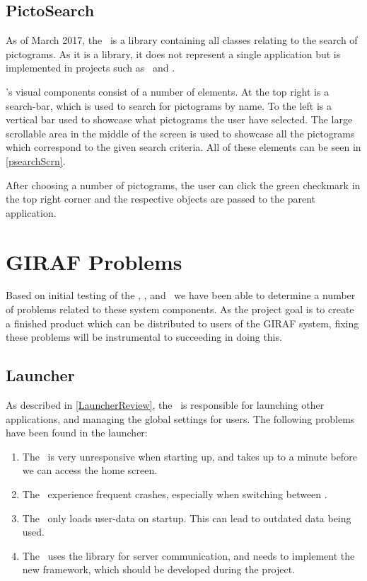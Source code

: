 \subsection{PictoSearch}\label{PictoSearchReview}
As of March 2017, the \plib\ is a library containing all
classes relating to the search of pictograms. As it is a library, it does not
represent a single application but is implemented in projects such as
\wapp\ and .\nl

\plib's visual components consist of a number of elements. At the top right is
a search-bar, which is used to search for pictograms by name. To the left is a
vertical bar used to showcase what pictograms the user have selected. The large
scrollable area in the middle of the screen is used to showcase all the
pictograms which correspond to the given search criteria. All of these elements
can be seen in \autoref{psearchScrn}.
 

After choosing a number of pictograms, the user can click the green checkmark in
the top right corner and the respective  objects are passed to
the parent application.

\section{GIRAF Problems}\label{GirafProblems}
Based on initial testing of the \lapp, \clib, and
\plib\ we have been able to determine a number of problems
related to these system components. As the project goal is to create a finished
product which can be distributed to users of the GIRAF system, fixing these problems
will be instrumental to succeeding in doing this.

\subsection{Launcher}
As described in \autoref{LauncherReview}, the \lapp\ is responsible for
launching other applications, and managing the global settings for users. The
following problems have been found in the launcher:
\begin{enumerate}
  \item The \lapp\ is very unresponsive when starting up, and takes up to a
  minute before we can access the home screen.
  \item The \lapp\ experience frequent crashes, especially when switching
  between .
  \item The \lapp\ only loads user-data on startup. This can lead to outdated
  data being used.
  \item The \lapp\ uses the  library for server communication, and needs
  to implement the new  framework, which should be developed during the project.
\end{enumerate}


